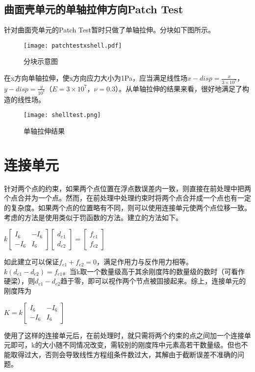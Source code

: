 \documentclass[forprint]{WHUBachelor}
\begin{document}
\subsection{曲面壳单元的单轴拉伸方向Patch Test}
针对曲面壳单元的Patch Test暂时只做了单轴拉伸。分块如下图所示。

\begin{figure}[h]
	\centering
	\texttt{[image: patchtestxshell.pdf]}  
	\caption{分块示意图} 
	\label{fig:mcmthesis-logo}
\end{figure}

在x方向单轴拉伸，使x方向应力大小为1Pa，应当满足线性场$x-disp=\frac{x}{3\times 10^7}$，$y-disp=\frac{y}{10^8}$（$E=3\times10^7$，$\nu=0.3$）。从单轴拉伸的结果来看，很好地满足了构造的线性场。
\begin{figure}[h]
	\centering
	\texttt{[image: shelltest.png]}  
	\caption{单轴拉伸结果} 
	\label{fig:mcmthesis-logo}
\end{figure}


\section{连接单元}
针对两个点的约束，如果两个点位置在浮点数误差内一致，则直接在前处理中把两个点合并为一个点。然而，在前处理中处理约束时将两个点合并成一个点也有一定的复杂度。如果两个点的位置略有不同，则可以使用连接单元使两个点位移一致。考虑的方法是使用类似于罚函数的方法。建立的方法如下。
\begin{center}
$k\left[\begin{matrix}
I_6&-I_6\\
-I_6&I_6
\end{matrix}\right]\left[\begin{matrix}
d_{e1}\\d_{e2}
\end{matrix}\right]=\left[\begin{matrix}
f_{e1}\\f_{e2}
\end{matrix}\right]$
\end{center}
如此建立可以保证$f_{e1}+f_{e2}=0$，满足作用力与反作用力相等。$k(d_{e1}-d_{e2})=f_{e1}$。当k取一个数量级高于其余刚度阵的数量级的数时（可看作硬梁），则$d_{e1}-d_{e2}$趋于零，即可以视作两个节点被固接起来。综上，连接单元的刚度阵为
\begin{center}
$K=k\left[\begin{matrix}
I_6&-I_6\\
-I_6&I_6
\end{matrix}\right]$
\end{center}
使用了这样的连接单元后，在前处理时，就只需将两个约束的点之间加一个连接单元即可，k的大小随不同情况改变，需较别的刚度阵中元素高若干数量级。但也不能取得过大，否则会导致线性方程组条件数过大，其解由于截断误差不准确的问题。
\end{document}
